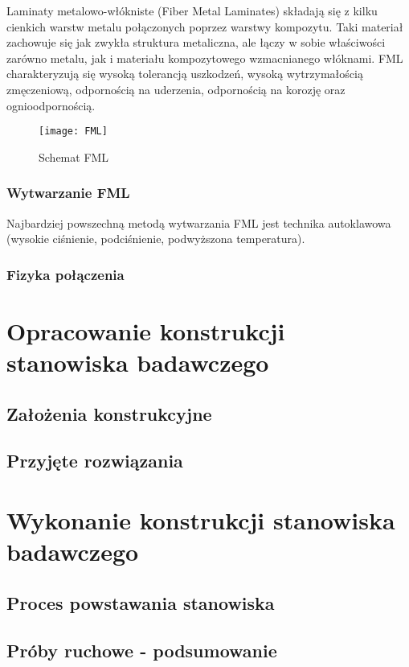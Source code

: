 \documentclass[magister,druk]{dyplom}
\begin{document}
Laminaty metalowo-włókniste (Fiber Metal Laminates) składają się z kilku cienkich warstw metalu połączonych poprzez warstwy kompozytu. Taki materiał zachowuje się jak zwykła struktura metaliczna, ale łączy w sobie właściwości zarówno metalu, jak i materiału kompozytowego wzmacnianego włóknami. FML charakteryzują się wysoką tolerancją uszkodzeń, wysoką wytrzymałością zmęczeniową, odpornością na uderzenia, odpornością na korozję oraz ognioodpornością\cite{FML}. 





\begin{figure}[H]
	\texttt{[image: FML]}
	\centering
	\caption{Schemat FML\cite{FMLold}}
\end{figure}

\subsection{Wytwarzanie FML}

Najbardziej powszechną metodą wytwarzania FML jest technika autoklawowa (wysokie ciśnienie, podciśnienie, podwyższona temperatura). 

\subsection{Fizyka połączenia}

\chapter{Opracowanie konstrukcji stanowiska badawczego}
\section{Założenia konstrukcyjne}
\section{Przyjęte rozwiązania}

\chapter{Wykonanie konstrukcji stanowiska badawczego}
\section{Proces powstawania stanowiska}
\section{Próby ruchowe - podsumowanie}
\end{document}
